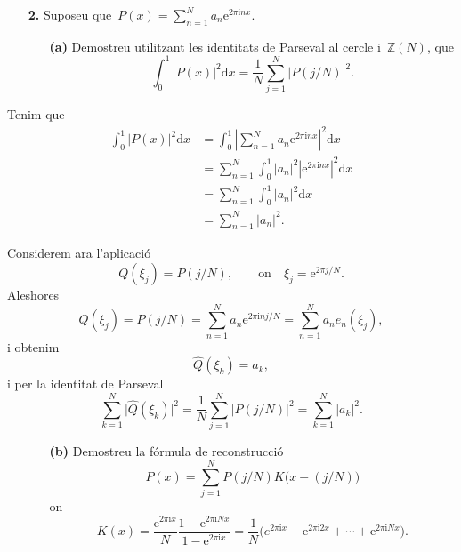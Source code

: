 \documentclass[a4paper]{article}
\theoremstyle{plain}
\theoremstyle{definition}
\newcommand{\iu}{\mathrm{i}}
\newcommand{\e}{\mathrm{e}}
\providecommand{\uppi}{\pi}
\newcommand{\diff}{\mathrm{d}}
\newcommand{\abs}[1]{\lvert{#1}\rvert}
\newcommand{\Abs}[1]{\left\lvert{#1}\right\rvert}
\newcommand{\ZZ}{\mathbb{Z}}
\begin{document}
\begin{enumerate}
    \item[\textbf{2.}] Suposeu
        que~\(\displaystyle P(x)=\sum_{n=1}^{N}a_{n}\e^{2\uppi\iu nx}\).
        \begin{enumerate}
            \item[\textbf{(a)}] Demostreu utilitzant les identitats de Parseval
                al cercle i~\(\ZZ(N)\), que
                \[
                    \int_{0}^{1}
                    \abs{P(x)}^{2}
                    \diff x
                    =
                    \frac{1}{N}
                    \sum_{j=1}^{N}
                    \abs{P(j/N)}^{2}.
                \]
        \end{enumerate}
\end{enumerate}

Tenim que
\begin{align*}
    \int_{0}^{1}
    \abs{P(x)}^{2}
    \diff x
    &=
    \int_{0}^{1}
    \Abs{
        \sum_{n=1}^{N}
        a_{n}\e^{2\uppi\iu nx}
    }^{2}
    \diff x \\
    &=
    \sum_{n=1}^{N}
    \int_{0}^{1}
    \abs{a_{n}}^{2}
    \Abs{
        \e^{2\uppi\iu nx}
    }^{2}
    \diff x \\
    &=
    \sum_{n=1}^{N}
    \int_{0}^{1}
    \abs{a_{n}}^{2}
    \diff x \\
    &=
    \sum_{n=1}^{N}
    \abs{a_{n}}^{2}.
\end{align*}

Considerem ara l'aplicació
\[
    Q(\xi_{j}) = P(j/N),
    \qquad
    \text{on}
    \quad
    \xi_{j} = \e^{2\uppi j/N}.
\]
Aleshores
\[
    Q(\xi_{j})
    =
    P(j/N)
    =
    \sum_{n=1}^{N}
    a_{n}
    \e^{2\uppi\iu nj/N}
    =
    \sum_{n=1}^{N}
    a_{n}
    e_{n}(\xi_{j}),
\]
i obtenim
\[
    \widehat{Q}(\xi_{k}) = a_{k},
\]
i per la identitat de Parseval
\[
    \sum_{k=1}^{N}
    \abs{\widehat{Q}(\xi_{k})}^{2}
    =
    \frac{1}{N}
    \sum_{j=1}^{N}
    \abs{P(j/N)}^{2}
    =
    \sum_{k=1}^{N}\abs{a_{k}}^{2}.
\]

\begin{enumerate}
    \item[]\begin{enumerate}
        \item[\textbf{(b)}] Demostreu la fórmula de reconstrucció
            \[
                P(x)
                =
                \sum_{j=1}^{N}
                P(j/N)
                K\bigl(x-(j/N)\bigr)
            \]
            on
            \[
                K(x)
                =
                \frac{\e^{2\uppi\iu x}}{N}
                \frac{1-\e^{2\uppi\iu Nx}}{1-\e^{2\uppi\iu x}}
                =
                \frac{1}{N}
                \bigl(
                    e^{2\uppi\iu x}
                    +
                    \e^{2\uppi\iu2x}
                    + \cdots +
                    \e^{2\uppi\iu Nx}
                \bigr).
            \]
    \end{enumerate}
\end{enumerate}
\end{document}
